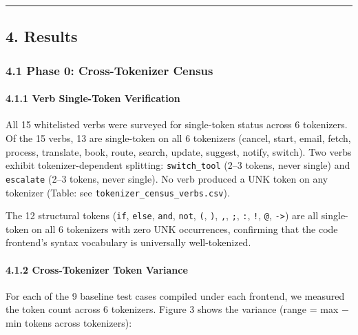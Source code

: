 \begin{center}\rule{0.5\linewidth}{0.5pt}\end{center}



\subsection{4. Results}\label{results}



\subsubsection{4.1 Phase 0: Cross-Tokenizer Census}\label{phase-0-cross-tokenizer-census}



\paragraph{4.1.1 Verb Single-Token Verification}\label{verb-single-token-verification}



All 15 whitelisted verbs were surveyed for single-token status across 6 tokenizers. Of the 15 verbs, 13 are single-token on all 6 tokenizers (cancel, start, email, fetch, process, translate, book, route, search, update, suggest, notify, switch). Two verbs exhibit tokenizer-dependent splitting: \texttt{switch\_tool} (2--3 tokens, never single) and \texttt{escalate} (2--3 tokens, never single). No verb produced a UNK token on any tokenizer (Table: see \texttt{tokenizer\_census\_verbs.csv}).



The 12 structural tokens (\texttt{if}, \texttt{else}, \texttt{and}, \texttt{not}, \texttt{(}, \texttt{)}, \texttt{,}, \texttt{;}, \texttt{:}, \texttt{!}, \texttt{@}, \texttt{-\textgreater{}}) are all single-token on all 6 tokenizers with zero UNK occurrences, confirming that the code frontend's syntax vocabulary is universally well-tokenized.



\paragraph{4.1.2 Cross-Tokenizer Token Variance}\label{cross-tokenizer-token-variance}



For each of the 9 baseline test cases compiled under each frontend, we measured the token count across 6 tokenizers. Figure 3 shows the variance (range = max − min tokens across tokenizers):



